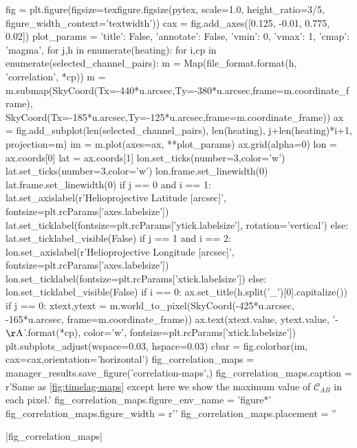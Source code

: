 \begin{pycode}
fig = plt.figure(figsize=texfigure.figsize(pytex, scale=1.0, height_ratio=3/5,
                                           figure_width_context='textwidth'))
cax = fig.add_axes([0.125, -0.01, 0.775, 0.02])
plot_params = {'title': False, 'annotate': False, 'vmin': 0, 'vmax': 1, 'cmap': 'magma',}
for j,h in enumerate(heating):
    for i,cp in enumerate(selected_channel_pairs):
        m = Map(file_format.format(h, 'correlation', *cp))
        m = m.submap(SkyCoord(Tx=-440*u.arcsec,Ty=-380*u.arcsec,frame=m.coordinate_frame),
                     SkyCoord(Tx=-185*u.arcsec,Ty=-125*u.arcsec,frame=m.coordinate_frame))
        ax = fig.add_subplot(len(selected_channel_pairs), len(heating), j+len(heating)*i+1,
                             projection=m)
        im = m.plot(axes=ax, **plot_params)
        ax.grid(alpha=0)
        lon = ax.coords[0]
        lat = ax.coords[1]
        lon.set_ticks(number=3,color='w')
        lat.set_ticks(number=3,color='w')
        lon.frame.set_linewidth(0)
        lat.frame.set_linewidth(0)
        if j == 0 and i == 1:
            lat.set_axislabel(r'Helioprojective Latitude [arcsec]', fontsize=plt.rcParams['axes.labelsize'])
            lat.set_ticklabel(fontsize=plt.rcParams['ytick.labelsize'], rotation='vertical')
        else:
            lat.set_ticklabel_visible(False)
        if j == 1 and i == 2:
            lon.set_axislabel(r'Helioprojective Longitude [arcsec]', fontsize=plt.rcParams['axes.labelsize'])
            lon.set_ticklabel(fontsize=plt.rcParams['xtick.labelsize'])
        else:
            lon.set_ticklabel_visible(False)
        if i == 0:
            ax.set_title(h.split('_')[0].capitalize())
        if j == 0:
            xtext,ytext = m.world_to_pixel(SkyCoord(-425*u.arcsec, -165*u.arcsec, frame=m.coordinate_frame))
            ax.text(xtext.value, ytext.value, '{}-{} $\mathrm{{\AA}}$'.format(*cp),
                    color='w', fontsize=plt.rcParams['xtick.labelsize'])
plt.subplots_adjust(wspace=0.03, hspace=0.03)
cbar = fig.colorbar(im, cax=cax,orientation='horizontal')
fig_correlation_maps = manager_results.save_figure('correlation-maps',)
fig_correlation_maps.caption = r'Same as \autoref{fig:timelag-maps} except here we show the maximum value of $\mathcal{C}_{AB}$ in each pixel.'
fig_correlation_maps.figure_env_name = 'figure*'
fig_correlation_maps.figure_width = r'\textwidth'
fig_correlation_maps.placement = ''
\end{pycode}
|fig_correlation_maps|


